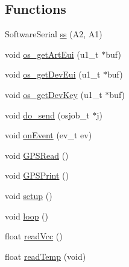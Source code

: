 \subsection*{Functions}
\begin{DoxyCompactItemize}
\item 
Software\-Serial \hyperlink{Uno__Dragino__LoRa__GPS__Shield__TTN_8ino_a1b73646ba668febc7062a5028603eeca}{ss} (A2, A1)
\item 
void \hyperlink{Uno__Dragino__LoRa__GPS__Shield__TTN_8ino_ad00e5aa32f425c7cf5b551edbe4e2018}{os\-\_\-get\-Art\-Eui} (u1\-\_\-t $\ast$buf)
\item 
void \hyperlink{Uno__Dragino__LoRa__GPS__Shield__TTN_8ino_a59f8459c9afe001b9d082b88f24bbc06}{os\-\_\-get\-Dev\-Eui} (u1\-\_\-t $\ast$buf)
\item 
void \hyperlink{Uno__Dragino__LoRa__GPS__Shield__TTN_8ino_a876d512ca10c7f577c86f5dc1894bc49}{os\-\_\-get\-Dev\-Key} (u1\-\_\-t $\ast$buf)
\item 
void \hyperlink{Uno__Dragino__LoRa__GPS__Shield__TTN_8ino_ab42efec0e8860ab768280a3d778b4c0e}{do\-\_\-send} (osjob\-\_\-t $\ast$j)
\item 
void \hyperlink{Uno__Dragino__LoRa__GPS__Shield__TTN_8ino_aaead836f5e0f65f5906b7ce269e92436}{on\-Event} (ev\-\_\-t ev)
\item 
void \hyperlink{Uno__Dragino__LoRa__GPS__Shield__TTN_8ino_aed5045d62c2fda212f05aace54598130}{G\-P\-S\-Read} ()
\item 
void \hyperlink{Uno__Dragino__LoRa__GPS__Shield__TTN_8ino_abc1b8327283b6705550bcee789d61711}{G\-P\-S\-Print} ()
\item 
void \hyperlink{Uno__Dragino__LoRa__GPS__Shield__TTN_8ino_a4fc01d736fe50cf5b977f755b675f11d}{setup} ()
\item 
void \hyperlink{Uno__Dragino__LoRa__GPS__Shield__TTN_8ino_afe461d27b9c48d5921c00d521181f12f}{loop} ()
\item 
float \hyperlink{Uno__Dragino__LoRa__GPS__Shield__TTN_8ino_a0b3195c3893f02cb1b80d878b89549d6}{read\-Vcc} ()
\item 
float \hyperlink{Uno__Dragino__LoRa__GPS__Shield__TTN_8ino_ada109bb0cdc12131465dfe7a74f93b1e}{read\-Temp} (void)
\end{DoxyCompactItemize}
